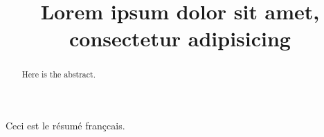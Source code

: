 \documentclass{acmetutorial}
\title
  [Lorem ipsum]
  {Lorem ipsum dolor sit amet, consectetur adipisicing}
\author
  {\firstname{John} \middlename{F.} \lastname{Doe}}
\author
  {\firstname{Another} \lastname{Author}}
\begin{document}
\begin{abstract}
  Here is the abstract.
\end{abstract}

\begin{altabstract}
  Ceci est le résumé françcais.
\end{altabstract}


\maketitle


\Blinddocument


\nocite{lorem, ipsum}


\end{document}
